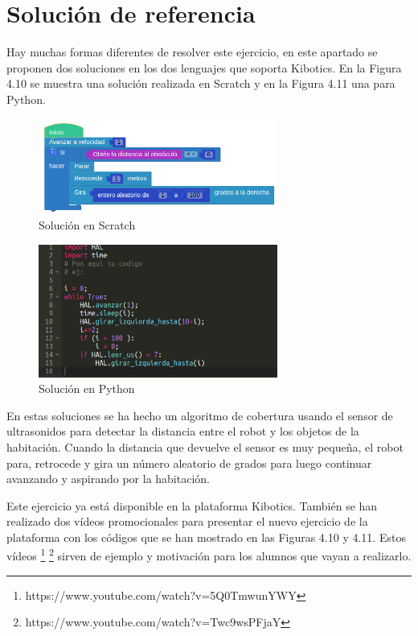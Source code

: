 \section{Solución de referencia}

Hay muchas formas diferentes  de resolver este ejercicio, en este apartado se proponen dos soluciones en los dos lenguajes que soporta Kibotics. En la Figura 4.10 se muestra una solución realizada en Scratch y en la Figura 4.11 una para Python.

\begin{figure}[H]
    \centering
    \includegraphics[width=0.7\textwidth, height=0.27\textwidth]{chapters/images/solucionroombascratch.png}
    \caption{Solución en Scratch }
    \label{fig:my_label}
\end{figure}
\begin{figure}[H]
    \centering
    \includegraphics[width=0.7\textwidth, height=0.27\textwidth]{chapters/images/solucionroombapython.png}
    \caption{Solución en Python}
    \label{fig:my_label}
\end{figure}

En estas soluciones se ha hecho un algoritmo de cobertura usando el sensor de ultrasonidos para detectar la distancia entre el robot y los objetos de la habitación. Cuando la distancia que devuelve el sensor es muy pequeña, el robot para, retrocede y gira un número aleatorio de grados para luego continuar avanzando y aspirando por la habitación.

Este ejercicio ya está disponible en la plataforma Kibotics. También se han realizado dos vídeos promocionales para presentar el nuevo ejercicio de la plataforma con los códigos que se han mostrado en las Figuras 4.10 y 4.11. Estos vídeos \footnote{https://www.youtube.com/watch?v=5Q0TmwunYWY} \footnote{https://www.youtube.com/watch?v=Twc9wsPFjaY} sirven de ejemplo y motivación para los alumnos que vayan a realizarlo.